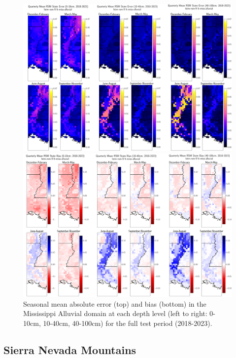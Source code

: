 \begin{figure}[h!p]
    \centering

    \includegraphics[width=.9\linewidth,draft=false]{figures/lt-miss-alluvial/eval-grid_lt-miss-alluvial_lstm-rsm-9_pixelwise-time-stats_abs-err_qtrly-err-state-all-3.png}

    \includegraphics[width=.9\linewidth,draft=false]{figures/lt-miss-alluvial/eval-grid_lt-miss-alluvial_lstm-rsm-9_pixelwise-time-stats_bias_qtrly-err-state-all-3.png}

    \caption{Seasonal mean absolute error (top) and bias (bottom) in the Mississippi Alluvial domain at each depth level (left to right: 0-10cm, 10-40cm, 40-100cm) for the full test period (2018-2023).}
    \label{lt_mae-bias_miss-alluvial}
\end{figure}

\newpage

\subsection{Sierra Nevada Mountains}


